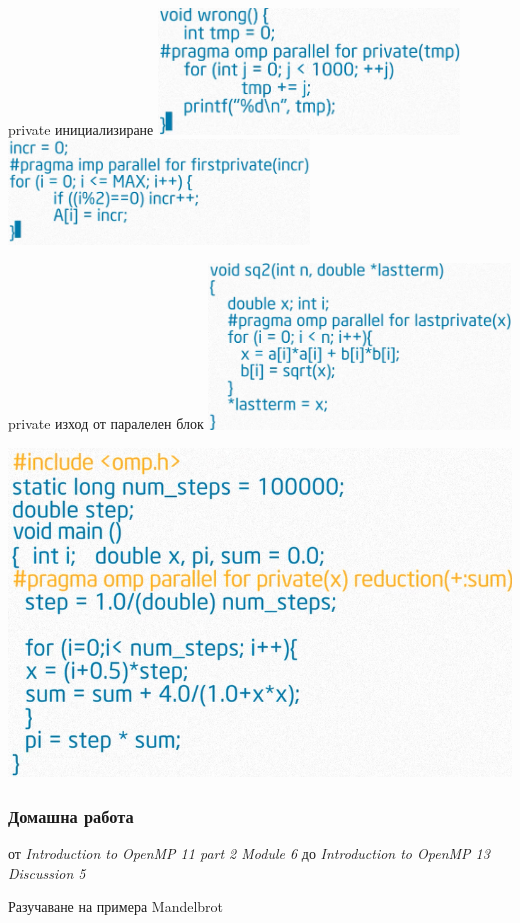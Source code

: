 \documentclass{beamer}
\begin{document}
\begin{frame}{private инициализиране}
\includegraphics[width=0.6\textwidth]{private-init.png} \pause
\includegraphics[width=0.6\textwidth]{private-init2.png}
\end{frame}


\begin{frame}{private изход от паралелен блок}
\includegraphics[width=0.6\textwidth]{private-init3.png}
\end{frame}

\begin{frame}
  \includegraphics[width=\textwidth]{pi}
\end{frame}

\begin{frame}
  \frametitle{Домашна работа}
  от \textit{Introduction to OpenMP 11 part 2 Module 6} до \textit{Introduction to OpenMP 13 Discussion 5}

  Разучаване на примера Mandelbrot
\end{frame}
\end{document}
